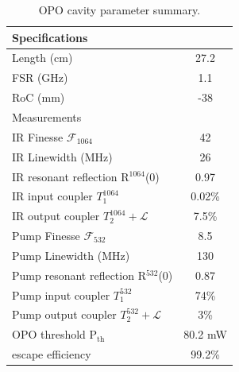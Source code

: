 \begin{table}[t!]
    \centering
    \captionsetup{width=0.55\linewidth}
    \begin{tabular}{lc}
        Specifications &  \\
        \hline
        Length (cm)              & 27.2 \\
        FSR (GHz)                  &  1.1\\
        RoC (mm) & -38 \\[0.6em]

        Measurements &  \\
        \hline
        IR Finesse $\mathcal{F}_{1064}$& 42 \\
        IR Linewidth (MHz)            & 26  \\
        IR resonant reflection R$^\text{1064}$(0) & 0.97 \\
        IR input coupler $T_1^{\text{1064}}$ & 0.02\%\\
        IR output coupler $T_2^{\text{1064}} + \mathcal{L}$ & 7.5\% \\[0.6em] 

        Pump Finesse $\mathcal{F}_{532}$& 8.5 \\
        Pump Linewidth (MHz)            &  130  \\
        Pump resonant reflection R$^{532}$(0) & 0.87 \\
        Pump input coupler $T_1^{532}$ & 74\% \\
        Pump output coupler $T_2^{532} + \mathcal{L}$ & 3\% \\[0.6em]

        OPO threshold P$_{\text{th}}$ & 80.2 mW \\
        escape efficiency & 99.2\% \\ 
    \end{tabular}
    \caption{OPO cavity parameter summary.}
    \label{tab:OPO params}
\end{table}



